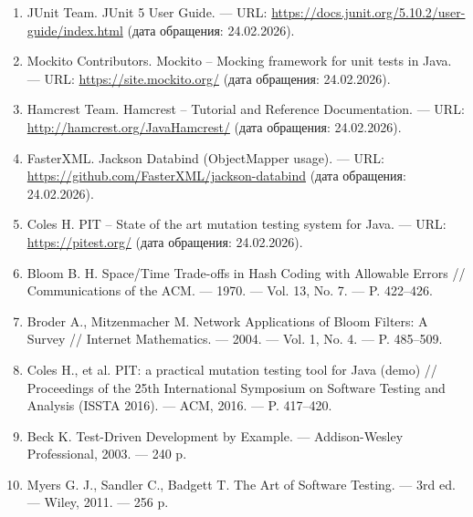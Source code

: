 \begin{enumerate}[label=\arabic*.]
  \item JUnit Team. JUnit 5 User Guide. --- URL: \url{https://docs.junit.org/5.10.2/user-guide/index.html} (дата обращения: 24.02.2026).
  
  \item Mockito Contributors. Mockito – Mocking framework for unit tests in Java. --- URL: \url{https://site.mockito.org/} (дата обращения: 24.02.2026).
  
  \item Hamcrest Team. Hamcrest – Tutorial and Reference Documentation. --- URL: \url{http://hamcrest.org/JavaHamcrest/} (дата обращения: 24.02.2026).
  
  \item FasterXML. Jackson Databind (ObjectMapper usage). --- URL: \url{https://github.com/FasterXML/jackson-databind} (дата обращения: 24.02.2026).
  
  \item Coles H. PIT – State of the art mutation testing system for Java. --- URL: \url{https://pitest.org/} (дата обращения: 24.02.2026).
  
  \item Bloom B. H. Space/Time Trade-offs in Hash Coding with Allowable Errors // Communications of the ACM. --- 1970. --- Vol. 13, No. 7. --- P. 422–426.
  
  \item Broder A., Mitzenmacher M. Network Applications of Bloom Filters: A Survey // Internet Mathematics. --- 2004. --- Vol. 1, No. 4. --- P. 485–509.
  
  \item Coles H., et al. PIT: a practical mutation testing tool for Java (demo) // Proceedings of the 25th International Symposium on Software Testing and Analysis (ISSTA 2016). --- ACM, 2016. --- P. 417–420.
  
  \item Beck K. Test-Driven Development by Example. --- Addison-Wesley Professional, 2003. --- 240 p.
  
  \item Myers G. J., Sandler C., Badgett T. The Art of Software Testing. --- 3rd ed. --- Wiley, 2011. --- 256 p.
\end{enumerate}



